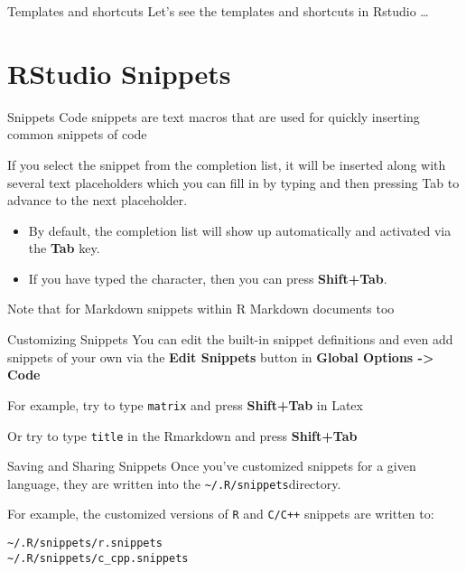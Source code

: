 \documentclass[
  ignorenonframetext,
]{beamer}
\begin{document}
\begin{frame}{Templates and shortcuts}
\label{templates-and-shortcuts}
Let's see the templates and shortcuts in Rstudio \ldots{}
\end{frame}

\section{RStudio Snippets}\label{rstudio-snippets}

\begin{frame}{Snippets}
\label{snippets}
Code snippets are text macros that are used for quickly inserting common
snippets of code

If you select the snippet from the completion list, it will be inserted
along with several text placeholders which you can fill in by typing and
then pressing Tab to advance to the next placeholder.

\begin{itemize}
\item
  By default, the completion list will show up automatically and
  activated via the \textbf{Tab} key.
\item
  If you have typed the character, then you can press
  \textbf{Shift+Tab}.
\end{itemize}

Note that for Markdown snippets within R Markdown documents too
\end{frame}

\begin{frame}[fragile]{Customizing Snippets}
\label{customizing-snippets}
You can edit the built-in snippet definitions and even add snippets of
your own via the \textbf{Edit Snippets} button in \textbf{Global Options
-\textgreater{} Code}

For example, try to type \texttt{matrix} and press \textbf{Shift+Tab} in
Latex

Or try to type \texttt{title} in the Rmarkdown and press
\textbf{Shift+Tab}
\end{frame}

\begin{frame}[fragile]{Saving and Sharing Snippets}
\label{saving-and-sharing-snippets}
Once you've customized snippets for a given language, they are written
into the \texttt{\textasciitilde{}/.R/snippets}directory.

For example, the customized versions of \texttt{R} and \texttt{C/C++}
snippets are written to:

\begin{verbatim}
~/.R/snippets/r.snippets
~/.R/snippets/c_cpp.snippets
\end{verbatim}
\end{frame}
\end{document}
